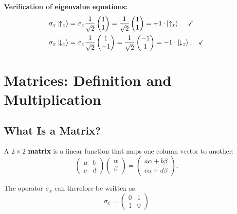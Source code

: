 \documentclass[11pt,a4paper]{article}
\theoremstyle{definition}
\theoremstyle{plain}
\theoremstyle{remark}
\begin{document}
\textbf{Verification of eigenvalue equations:}
\begin{align}
    \sigma_x\ket{\uparrow_x} &= \sigma_x \frac{1}{\sqrt{2}}\begin{pmatrix}1\\1\end{pmatrix} = \frac{1}{\sqrt{2}}\begin{pmatrix}1\\1\end{pmatrix} = +1\cdot\ket{\uparrow_x}. \quad\checkmark \\
    \sigma_x\ket{\downarrow_x} &= \sigma_x \frac{1}{\sqrt{2}}\begin{pmatrix}1\\-1\end{pmatrix} = \frac{1}{\sqrt{2}}\begin{pmatrix}-1\\1\end{pmatrix} = -1\cdot\ket{\downarrow_x}. \quad\checkmark
\end{align}

\section{Matrices: Definition and Multiplication}

\subsection{What Is a Matrix?}

A $2 \times 2$ \textbf{matrix} is a linear function that maps one column vector to another:
\[
    \begin{pmatrix} a & b \\ c & d \end{pmatrix} \begin{pmatrix} \alpha \\ \beta \end{pmatrix} = \begin{pmatrix} a\alpha + b\beta \\ c\alpha + d\beta \end{pmatrix}.
\]

The operator $\sigma_x$ can therefore be written as:
\[
    \boxed{\sigma_x = \begin{pmatrix} 0 & 1 \\ 1 & 0 \end{pmatrix}}
\]
\end{document}
